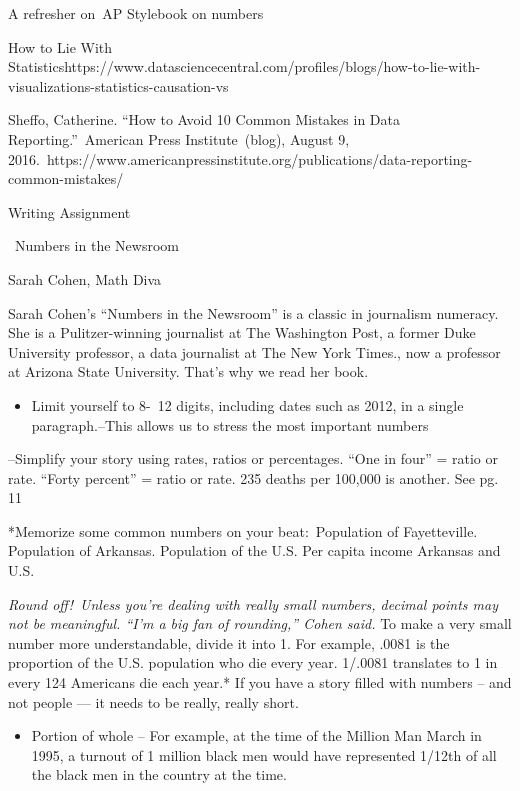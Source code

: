 \documentclass[]{book}
\providecommand{\tightlist}{%
  \setlength{\itemsep}{0pt}\setlength{\parskip}{0pt}}
\begin{document}
A refresher on~AP Stylebook on numbers

How to Lie With Statisticshttps://www.datasciencecentral.com/profiles/blogs/how-to-lie-with-visualizations-statistics-causation-vs

Sheffo, Catherine. ``How to Avoid 10 Common Mistakes in Data Reporting.''~American Press Institute~(blog), August 9, 2016.~https://www.americanpressinstitute.org/publications/data-reporting-common-mistakes/

Writing Assignment

~Numbers in the Newsroom

Sarah Cohen, Math Diva

Sarah Cohen's ``Numbers in the Newsroom'' is a classic in journalism numeracy. She is a Pulitzer-winning journalist at The Washington Post, a former Duke University professor, a data journalist at The New York Times., now a professor at Arizona State University. That's why we read her book.

\begin{itemize}
\tightlist
\item
  Limit yourself to 8-~12 digits, including dates such as 2012, in a single paragraph.--This allows us to stress the most important numbers
\end{itemize}

--Simplify your story using rates, ratios or percentages. ``One in four'' = ratio or rate. ``Forty percent'' = ratio or rate. 235 deaths per 100,000 is another. See pg. 11

*Memorize some common numbers on your beat:~Population of Fayetteville. Population of Arkansas. Population of the U.S. Per capita income Arkansas and U.S.

\emph{Round off!~Unless you're dealing with really small numbers, decimal points may not be meaningful. ``I'm a big fan of rounding,'' Cohen said.} To make a very small number more understandable, divide it into 1. For example, .0081 is the proportion of the U.S. population who die every year. 1/.0081 translates to 1 in every 124 Americans die each year.* If you have a story filled with numbers -- and not people --- it needs to be really, really short.

\begin{itemize}
\tightlist
\item
  Portion of whole -- For example, at the time of the Million Man March in 1995, a turnout of 1 million black men would have represented 1/12th of all the black men in the country at the time.
\end{itemize}
\end{document}
